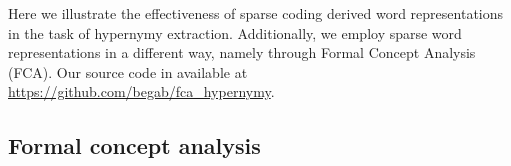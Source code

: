 \documentclass[11pt,a4paper]{article}
\begin{document}
Here we illustrate the effectiveness of sparse coding derived word representations in the task of hypernymy extraction. Additionally, we employ sparse word representations in a different way, namely through Formal Concept Analysis (FCA).
Our source code in available at \url{https://github.com/begab/fca_hypernymy}.




\subsection{Formal concept analysis}

\newcommand{\ob}{\ensuremath{\mathcal O}}
\newcommand{\at}{\ensuremath{\mathcal A}}
\newcommand{\inci}{\ensuremath{\mathcal I}}
\newcommand{\oaconc}{\ensuremath{\langle O, A\rangle}}
\end{document}

